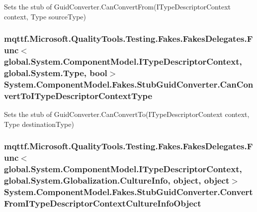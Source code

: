 Sets the stub of Guid\-Converter.\-Can\-Convert\-From(\-I\-Type\-Descriptor\-Context context, Type source\-Type)

\hypertarget{class_system_1_1_component_model_1_1_fakes_1_1_stub_guid_converter_ab1a4143265127762b1d83a391281e9c1}{
\subsubsection[{Can\-Convert\-To\-I\-Type\-Descriptor\-Context\-Type}]{\setlength{\rightskip}{0pt plus 5cm}mqttf.\-Microsoft.\-Quality\-Tools.\-Testing.\-Fakes.\-Fakes\-Delegates.\-Func$<$global.\-System.\-Component\-Model.\-I\-Type\-Descriptor\-Context, global.\-System.\-Type, bool$>$ System.\-Component\-Model.\-Fakes.\-Stub\-Guid\-Converter.\-Can\-Convert\-To\-I\-Type\-Descriptor\-Context\-Type}}\label{class_system_1_1_component_model_1_1_fakes_1_1_stub_guid_converter_ab1a4143265127762b1d83a391281e9c1}


Sets the stub of Guid\-Converter.\-Can\-Convert\-To(\-I\-Type\-Descriptor\-Context context, Type destination\-Type)

\hypertarget{class_system_1_1_component_model_1_1_fakes_1_1_stub_guid_converter_ad6ef6325412c45f4bea7add53593f53f}{
\subsubsection[{Convert\-From\-I\-Type\-Descriptor\-Context\-Culture\-Info\-Object}]{\setlength{\rightskip}{0pt plus 5cm}mqttf.\-Microsoft.\-Quality\-Tools.\-Testing.\-Fakes.\-Fakes\-Delegates.\-Func$<$global.\-System.\-Component\-Model.\-I\-Type\-Descriptor\-Context, global.\-System.\-Globalization.\-Culture\-Info, object, object$>$ System.\-Component\-Model.\-Fakes.\-Stub\-Guid\-Converter.\-Convert\-From\-I\-Type\-Descriptor\-Context\-Culture\-Info\-Object}}\label{class_system_1_1_component_model_1_1_fakes_1_1_stub_guid_converter_ad6ef6325412c45f4bea7add53593f53f}


